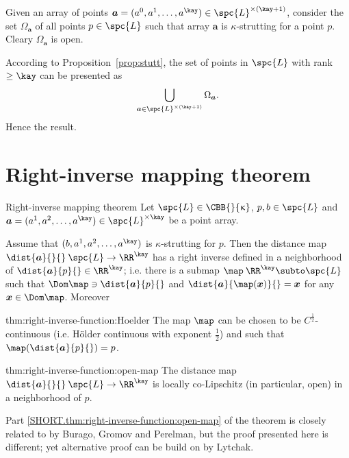  Given an array of points $\bm{a}=(a^0,a^1,\dots,a^\kay)\in \spc{L}^{{\times}(\kay+1)}$, consider 
the set $\Omega_{\bm{a}}$ of all points $p\in \spc{L}$ such that array $\bm{a}$
 is $\kappa$-strutting for a point $p$.
Cleary $\Omega_{\bm{a}}$ is open.

According to Proposition~\ref{prop:stutt}, the set of points in $\spc{L}$ 
with rank $\ge \kay$ can be presented as
\[\bigcup_{\bm{a}\in \spc{L}^{{\times}(\kay+1)}}\Omega_{\bm{a}}.\]
Hence the result.
\qeds





\section{Right-inverse mapping theorem}\label{sec:right-inverse-1}


\begin{thm}{Right-inverse mapping theorem}
\label{thm:right-inverse-function}
Let $\spc{L}\in\CBB{}{\kappa}$,
$p,b\in\spc{L}$ 
and $\bm{a}=(a^1,a^2,\dots,a^\kay)\in\spc{L}^{{\times}\kay}$ be a point array.

Assume that $(b,a^1,a^2,\dots,a^\kay)$ is $\kappa$-strutting for $p$.
Then the distance map $\dist{\bm{a}}{}{}\:\spc{L}\to\RR^\kay$  has a right inverse defined in a neighborhood of $\dist{\bm{a}}{p}{}\in\RR^\kay$;
i.e. there is a submap $\map\:\RR^\kay\subto\spc{L}$ such that $\Dom \map\ni \dist{\bm{a}}{p}{}$ and 
$\dist{\bm{a}}{\map(\bm{x})}{}=\bm{x}$ for any $\bm{x}\in\Dom \map$.
Moreover

\begin{subthm}{thm:right-inverse-function:Hoelder}
The map $\map$ can be chosen to be $C^{\frac{1}{2}}$-continuous (i.e. H\"older continuous with exponent $\tfrac{1}{2}$) and such that 
$\map(\dist{\bm{a}}{p}{})=p$.
\end{subthm}

\begin{subthm}{thm:right-inverse-function:open-map}
The distance map $\dist{\bm{a}}{}{}\:\spc{L}\to\RR^\kay$ is locally co-Lipschitz (in particular, open) in a neighborhood of $p$.
\end{subthm}

\end{thm}

Part \ref{SHORT.thm:right-inverse-function:open-map} of the theorem 
is closely related to \cite[Theorem 5.4]{BGP} by Burago, Gromov and Perelman, 
but the proof presented here is different; 
yet alternative proof can be build on \cite[Proposition~4.3]{lytchak:open-map} by Lytchak.

